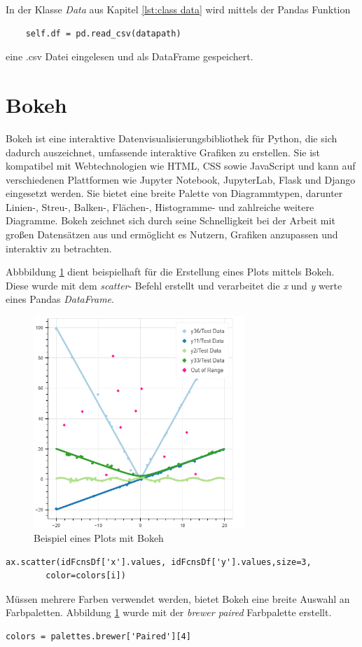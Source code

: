  In der Klasse \textit{Data} aus Kapitel \ref{lst:class data} wird mittels der Pandas Funktion
 \begin{lstlisting}
 	self.df = pd.read_csv(datapath)
 \end{lstlisting}
 eine .csv Datei eingelesen und als DataFrame gespeichert. 

 
 \section{Bokeh}
 Bokeh ist eine interaktive Datenvisualisierungsbibliothek für Python, die sich dadurch auszeichnet, umfassende interaktive Grafiken zu erstellen. Sie ist kompatibel mit Webtechnologien wie HTML, CSS sowie JavaScript und kann auf verschiedenen Plattformen wie Jupyter Notebook, JupyterLab, Flask und Django eingesetzt werden.
 Sie bietet eine breite Palette von Diagrammtypen, darunter Linien-, Streu-, Balken-, Flächen-, Histogramme- und zahlreiche weitere Diagramme. Bokeh zeichnet sich durch seine Schnelligkeit bei der Arbeit mit großen Datensätzen aus und ermöglicht es Nutzern, Grafiken anzupassen und interaktiv zu betrachten. 
 
Abbbildung \ref{fig:bokeh} dient beispielhaft für die Erstellung eines Plots mittels Bokeh. Diese wurde mit dem \textit{scatter}- Befehl erstellt und verarbeitet die \textit{x} und \textit{y} werte eines Pandas \textit{DataFrame}.
 \begin{figure}[h]
 	\centering
 	\includegraphics[width=8cm]{pics/bokeh_plot.png}
 	\caption{Beispiel eines Plots mit Bokeh }
 	\label{fig:bokeh}
 \end{figure} 
 
 \begin{lstlisting}[caption={Bsp.: Bokeh Scatter-Plot}, captionpos=b, label={lst:plot}]
 	ax.scatter(idFcnsDf['x'].values, idFcnsDf['y'].values,size=3,
 		color=colors[i])
 \end{lstlisting}
 
 Müssen mehrere Farben verwendet werden, bietet Bokeh eine breite Auswahl an Farbpaletten. Abbildung \ref{fig:bokeh} wurde mit der \textit{brewer paired} Farbpalette erstellt. 
 \begin{lstlisting}[caption={Bokeh Farb-Palette}, captionpos=b, label={lst:brewer color}]
 	colors = palettes.brewer['Paired'][4]   
 \end{lstlisting}
 